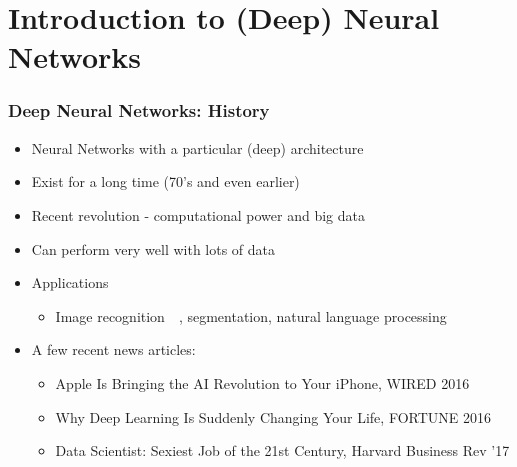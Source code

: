 \documentclass[12pt,fleqn]{beamer}
\begin{document}


\section{Introduction to (Deep) Neural Networks} %
\label{sec:introduction_to_deep_neural_networks}

\begin{frame}\frametitle{{Deep Neural Networks: History}}

\begin{itemize}
	\item Neural Networks with a particular (deep) architecture
    \item Exist for a long time (70's and even earlier)~\cite{Rosenblatt1958,Rumelhart1986,LeCun1990}
    \item Recent revolution - computational power and big data~\cite{bengio2009learning,RainaEtAl2009,lecun2015deep}
    \item Can perform very well with lots of data
    \item Applications
    \begin{itemize}
    \item Image recognition~~\cite{hinton2012deep,KrizhevskySutskeverHinton2012,lecun2015deep}, segmentation, natural language processing~\cite{BordesEtAl2014,CollobertEtAl2011,  JeanEtAl2014}
    \end{itemize}


    \pause

\item A few recent news articles:

 \begin{itemize}
    \item
{Apple Is Bringing the AI Revolution to Your iPhone, WIRED 2016}
\item
{Why Deep Learning Is Suddenly Changing Your Life,  FORTUNE 2016}
\item Data Scientist: Sexiest Job of the 21st Century, Harvard Business Rev ’17
\end{itemize}

\end{itemize}
\end{frame}
\end{document}
